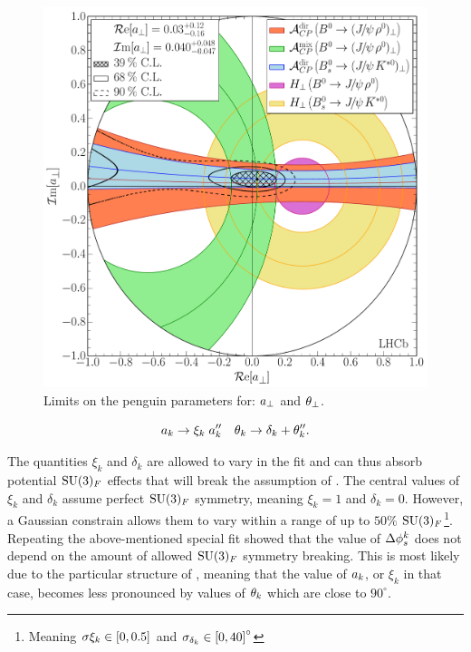 \begin{figure}[!t]
  \centering
  \includegraphics[trim=0.0cm 0.0cm 0.0cm 0.0cm, clip=true,scale=0.4]{Figures/Chapter5/Penguin_Contribution_Re_vs_Im_allB2VV_Perp_withH.pdf}
  \caption{Limits on the penguin parameters for: $a_{\perp}$ and $\theta_{\perp}$.}
  \label{pengPlot_perp}
\end{figure}

\begin{equation}
  \centering
  \akPeng \to \xi_k \; \akPeng'' \quad \thkPeng \to \delta_k + \thkPeng''.
\label{su3_breaking_invoke}
\end{equation}

\noindent The quantities $\xi_k$ and $\delta_k$ are allowed to vary in the fit and can thus absorb
potential $\mathrm{SU}(3)_F$ effects that will break the assumption of .
The central values of $\xi_k$ and $\delta_k$ assume perfect $\mathrm{SU}(3)_F$ symmetry, meaning $\xi_k=1$ and $\delta_k=0$.
However, a Gaussian constrain allows them to vary within a range of up to $50\%$
$\mathrm{SU}(3)_F$\footnote{Meaning $\sigma{\xi_k}\in\left[ 0,0.5 \right]$ and $\sigma_{\delta_k}\in\left[ 0,40 \right]^\circ$ }.
Repeating the above-mentioned special fit showed that the value of $\Delta\phi_{s}^{k}$
does not depend on the amount of allowed $\mathrm{SU}(3)_F$ symmetry breaking.
This is most likely due to the particular structure of , meaning that
the value of $a_k$, or $\xi_k$ in that case, becomes less pronounced by values of
$\theta_k$ which are close to $90^\circ$.

